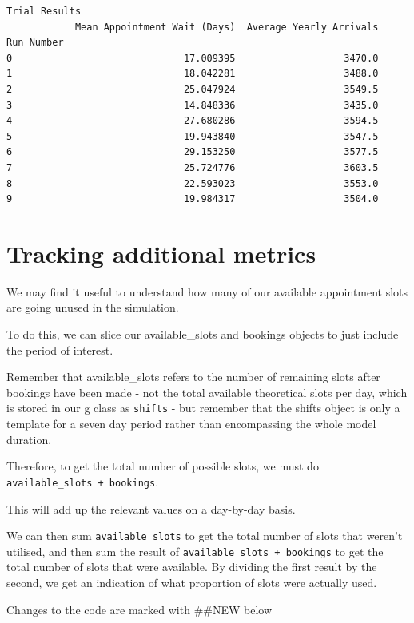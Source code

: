 \documentclass[
  letterpaper,
  DIV=11,
  numbers=noendperiod]{scrreprt}
\begin{document}
\begin{verbatim}
Trial Results
            Mean Appointment Wait (Days)  Average Yearly Arrivals
Run Number                                                       
0                              17.009395                   3470.0
1                              18.042281                   3488.0
2                              25.047924                   3549.5
3                              14.848336                   3435.0
4                              27.680286                   3594.5
5                              19.943840                   3547.5
6                              29.153250                   3577.5
7                              25.724776                   3603.5
8                              22.593023                   3553.0
9                              19.984317                   3504.0
\end{verbatim}

\section{Tracking additional metrics}\label{tracking-additional-metrics}

We may find it useful to understand how many of our available
appointment slots are going unused in the simulation.

To do this, we can slice our available\_slots and bookings objects to
just include the period of interest.

Remember that available\_slots refers to the number of remaining slots
after bookings have been made - not the total available theoretical
slots per day, which is stored in our g class as \texttt{shifts} - but
remember that the shifts object is only a template for a seven day
period rather than encompassing the whole model duration.

Therefore, to get the total number of possible slots, we must do
\texttt{available\_slots\ +\ bookings}.

This will add up the relevant values on a day-by-day basis.

We can then sum \texttt{available\_slots} to get the total number of
slots that weren't utilised, and then sum the result of
\texttt{available\_slots\ +\ bookings} to get the total number of slots
that were available. By dividing the first result by the second, we get
an indication of what proportion of slots were actually used.

\begin{tcolorbox}[enhanced jigsaw, rightrule=.15mm, colback=white, colframe=quarto-callout-note-color-frame, colbacktitle=quarto-callout-note-color!10!white, toprule=.15mm, coltitle=black, opacityback=0, titlerule=0mm, bottomtitle=1mm, breakable, title=\textcolor{quarto-callout-note-color}{\faInfo}\hspace{0.5em}{Note}, opacitybacktitle=0.6, toptitle=1mm, arc=.35mm, bottomrule=.15mm, leftrule=.75mm, left=2mm]

Changes to the code are marked with \#\#NEW below

\end{tcolorbox}
\end{document}
